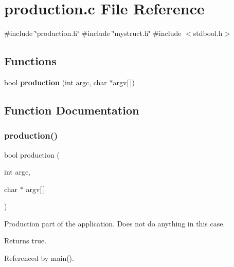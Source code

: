 \section{production.\+c File Reference}
\label{production_8c}
{\ttfamily \#include \char`\"{}production.\+h\char`\"{}}\newline
{\ttfamily \#include \char`\"{}mystruct.\+h\char`\"{}}\newline
{\ttfamily \#include $<$stdbool.\+h$>$}\newline
\subsection*{Functions}
\begin{DoxyCompactItemize}
\item 
bool \textbf{ production} (int argc, char $\ast$argv[$\,$])
\end{DoxyCompactItemize}


\subsection{Function Documentation}
\mbox{\label{production_8c_a9f67b51c42a54745557e7a2c9c07c46f}} 
\subsubsection{production()}
{\footnotesize\ttfamily bool production (\begin{DoxyParamCaption}\item[{int}]{argc,  }\item[{char $\ast$}]{argv[$\,$] }\end{DoxyParamCaption})}

Production part of the application. Does not do anything in this case. \begin{DoxyReturn}{Returns}
true. 
\end{DoxyReturn}


Referenced by main().

